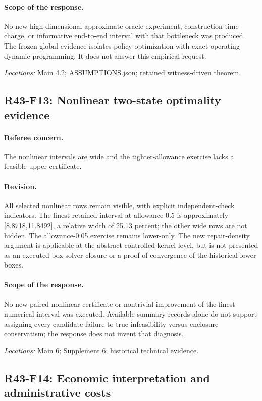 \paragraph*{Scope of the response.} No new high-dimensional approximate-oracle experiment, construction-time charge, or informative end-to-end interval with that bottleneck was produced. The frozen global evidence isolates policy optimization with exact operating dynamic programming. It does not answer this empirical request.

\noindent\textit{Locations:} Main 4.2; ASSUMPTIONS.json; retained witness-driven theorem.

\subsection{R43-F13: Nonlinear two-state optimality evidence}
\paragraph*{Referee concern.} The nonlinear intervals are wide and the tighter-allowance exercise lacks a feasible upper certificate.

\paragraph*{Revision.} All selected nonlinear rows remain visible, with explicit independent-check indicators. The finest retained interval at allowance 0.5 is approximately [8.8718,11.8492], a relative width of 25.13 percent; the other wide rows are not hidden. The allowance-0.05 exercise remains lower-only. The new repair-density argument is applicable at the abstract controlled-kernel level, but is not presented as an executed box-solver closure or a proof of convergence of the historical lower boxes.

\paragraph*{Scope of the response.} No new paired nonlinear certificate or nontrivial improvement of the finest numerical interval was executed. Available summary records alone do not support assigning every candidate failure to true infeasibility versus enclosure conservatism; the response does not invent that diagnosis.

\noindent\textit{Locations:} Main 6; Supplement 6; historical technical evidence.

\subsection{R43-F14: Economic interpretation and administrative costs}
